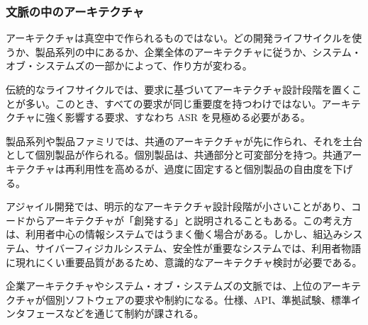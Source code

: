 \subsubsection{文脈の中のアーキテクチャ}
アーキテクチャは真空中で作られるものではない。どの開発ライフサイクルを使うか、製品系列の中にあるか、企業全体のアーキテクチャに従うか、システム・オブ・システムズの一部かによって、作り方が変わる。

伝統的なライフサイクルでは、要求に基づいてアーキテクチャ設計段階を置くことが多い。このとき、すべての要求が同じ重要度を持つわけではない。アーキテクチャに強く影響する要求、すなわち ASR を見極める必要がある。

製品系列や製品ファミリでは、共通のアーキテクチャが先に作られ、それを土台として個別製品が作られる。個別製品は、共通部分と可変部分を持つ。共通アーキテクチャは再利用性を高めるが、過度に固定すると個別製品の自由度を下げる。

アジャイル開発では、明示的なアーキテクチャ設計段階が小さいことがあり、コードからアーキテクチャが「創発する」と説明されることもある。この考え方は、利用者中心の情報システムではうまく働く場合がある。しかし、組込みシステム、サイバーフィジカルシステム、安全性が重要なシステムでは、利用者物語に現れにくい重要品質があるため、意識的なアーキテクチャ検討が必要である。

企業アーキテクチャやシステム・オブ・システムズの文脈では、上位のアーキテクチャが個別ソフトウェアの要求や制約になる。仕様、API、準拠試験、標準インタフェースなどを通じて制約が課される。
